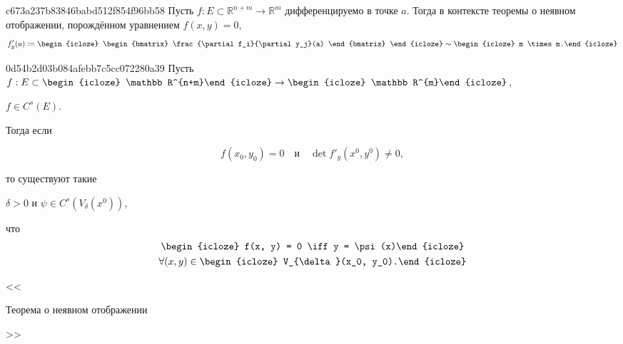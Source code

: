 \begin{note}{c673a237b83846babd512f854f96bb58}
    Пусть \({ f : E \subset \mathbb R^{n + m} \to \mathbb R^{m} }\) дифференцируемо в точке \({ a }\).
    Тогда в контексте теоремы о неявном отображении, порождённом уравнением \({ f(x, y) = 0 }\),
    \[
        f'_{y}(a) \coloneqq
        \begin{icloze}{1}
            \begin{bmatrix}
                \frac{\partial f_i}{\partial y_j}(a)
            \end{bmatrix}
        \end{icloze}
        \sim \begin{icloze}{2}m \times m.\end{icloze}
    \]
\end{note}

\begin{note}{0d54b2d03b084afebb7c5cc072280a39}
    Пусть \({ f : E \subset \begin{icloze}{4}\mathbb R^{n+m}\end{icloze} \to \begin{icloze}{4}\mathbb R^{m}\end{icloze} }\), \begin{icloze}{5}\({ f \in C^{s}(E) }\).\end{icloze}
    Тогда если
    \begin{icloze}{1}
        \[
            f(x_{0}, y_{0}) = 0 \quad \text{и} \quad \det f'_{y}(x^{0}, y^{0}) \neq 0,
        \]
    \end{icloze}
    то существуют такие \begin{icloze}{2}\({ \delta > 0 }\) и \({ \psi \in C^{s}(V_{\delta}(x^0)) }\),\end{icloze} что
    \[
        \begin{gathered}
            \begin{icloze}{3}f(x, y) = 0 \iff y = \psi(x)\end{icloze} \\
            \forall (x, y) \in \begin{icloze}{6}V_{\delta}(x_0, y_0).\end{icloze}
        \end{gathered}
    \]

    \begin{center}
        \tiny
        <<\begin{icloze}{6}Теорема о неявном отображении\end{icloze}>>
    \end{center}
\end{note}

